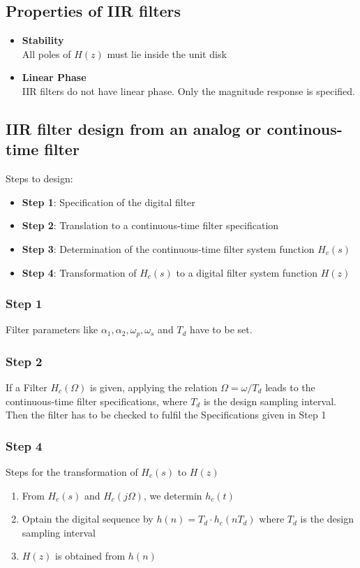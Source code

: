 \documentclass[accentcolor=tud4c,9.5pt,nochapname,bigchapter,paper=a5report]{tudreport}
\begin{document}
 
\subsection{Properties of IIR filters}
\begin{itemize}
  \item {\bf Stability}\\ All poles of $H(z)$ must lie inside the unit disk
  \item {\bf Linear Phase}\\ IIR filters do not have linear phase. Only the magnitude response is specified.
\end{itemize}

\subsection{IIR filter design from an analog or continous-time filter}
Steps to design:
\begin{itemize}
  \item {\bf Step 1}: Specification of the digital filter
  \item {\bf Step 2}: Translation to a continuous-time filter specification
  \item {\bf Step 3}: Determination of the continuous-time filter system function $H_c(s)$
  \item {\bf Step 4}: Transformation of $H_c(s)$ to a digital filter system function $H(z)$
\end{itemize}
\subsubsection{Step 1}
Filter parameters like $\alpha_1,\alpha_2,\omega_p,\omega_s$ and $T_d$ have to be set.
\subsubsection{Step 2}
If a Filter $H_c(\Omega)$ is given, applying the relation $\Omega=\omega/T_d$ leads to the continuous-time filter specifications, where $T_d$ 
is the design sampling interval. Then the filter has to be checked to fulfil the Specifications given in Step 1

\subsubsection{Step 4}
Steps for the transformation of $H_c(s)$ to $H(z)$
\begin{enumerate}
  \item From $H_c(s)$ and $H_c(j\Omega)$, we determin $h_c(t)$
  \item Optain the digital sequence by $h(n)=T_d\cdot h_c(nT_d)$ where $T_d$ is the design sampling interval
  \item $H(z)$ is obtained from $h(n)$
\end{enumerate}
\end{document}
